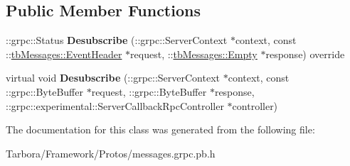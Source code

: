 \subsection*{Public Member Functions}
\begin{DoxyCompactItemize}
\item 
\mbox{\label{classtbMessages_1_1TarboraMessages_1_1ExperimentalWithRawCallbackMethod__Desubscribe_a5e5d7bf517952185b6ad763b8a1645f6}} 
\+::grpc\+::\+Status {\bfseries Desubscribe} (\+::grpc\+::\+Server\+Context $\ast$context, const \+::\hyperlink{classtbMessages_1_1EventHeader}{tb\+Messages\+::\+Event\+Header} $\ast$request, \+::\hyperlink{classtbMessages_1_1Empty}{tb\+Messages\+::\+Empty} $\ast$response) override
\item 
\mbox{\label{classtbMessages_1_1TarboraMessages_1_1ExperimentalWithRawCallbackMethod__Desubscribe_acdd9b596c3c87ec85b19981bad38080b}} 
virtual void {\bfseries Desubscribe} (\+::grpc\+::\+Server\+Context $\ast$context, const \+::grpc\+::\+Byte\+Buffer $\ast$request, \+::grpc\+::\+Byte\+Buffer $\ast$response, \+::grpc\+::experimental\+::\+Server\+Callback\+Rpc\+Controller $\ast$controller)
\end{DoxyCompactItemize}


The documentation for this class was generated from the following file\+:\begin{DoxyCompactItemize}
\item 
Tarbora/\+Framework/\+Protos/messages.\+grpc.\+pb.\+h\end{DoxyCompactItemize}
